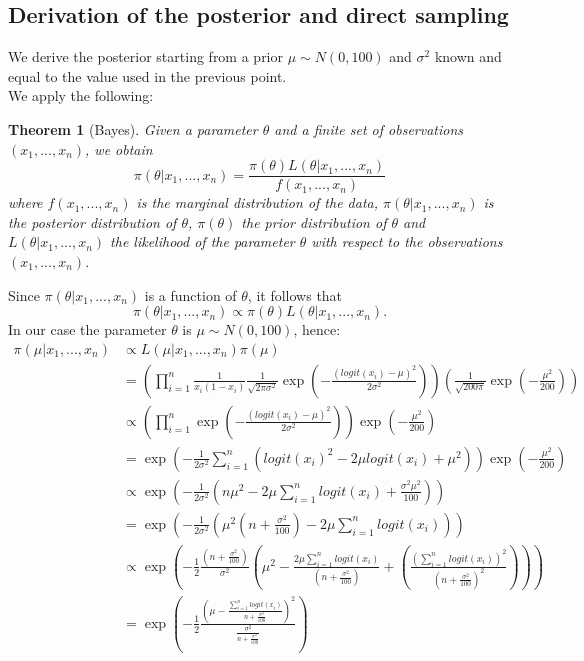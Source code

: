 \documentclass[a4paper,12pt]{article}
\newtheorem{theorem}{Theorem}[section]
\begin{document}
\subsection{Derivation of the posterior and direct sampling}
We derive the posterior starting from a prior \( \mu \sim N(0,100)\) and \(\sigma^2\) known and equal to the value used in the previous point. \\
We apply the following:
\begin{theorem}[Bayes]
    Given a parameter \(\theta\) and a finite set of observations \((x_1,...,x_n)\), we obtain
    \[ \pi(\theta|x_1,...,x_n) = \frac{\pi(\theta)L(\theta|x_1,...,x_n)}{f(x_1,...,x_n)}\]
    where \(f(x_1,...,x_n)\) is the marginal distribution of the data, \(\pi(\theta|x_1,...,x_n)\) is the posterior distribution of \(\theta\), \(\pi(\theta)\) the prior distribution of \(\theta\) and \(L(\theta|x_1,...,x_n)\) the likelihood of the parameter \(\theta\) with respect to the observations \((x_1,...,x_n)\).
\end{theorem}
Since \(\pi(\theta|x_1,...,x_n)\) is a function of \(\theta\), it follows that
\[\pi(\theta|x_1,...,x_n) \propto \pi(\theta)L(\theta|x_1,...,x_n).\]
In our case the parameter \(\theta\) is \(\mu \sim N(0,100)\), hence:
\begin{align*}
    \pi(\mu|x_1,...,x_n) &\propto L(\mu|x_1,...,x_n)\pi(\mu) \\
    &= \left(\prod_{i=1}^{n} \frac{1}{x_i(1-x_i)} \frac{1}{\sqrt{2\pi\sigma^2}} \exp \left(-\frac{(logit(x_i)-\mu)^2}{2\sigma^2} \right) \right) \left( \frac{1}{\sqrt{200 \pi}} \exp\left(-\frac{\mu^2}{200} \right) \right)  \\
    &\propto \left(\prod_{i=1}^{n} \exp \left(-\frac{(logit(x_i)-\mu)^2}{2\sigma^2} \right)  \right) \exp\left(-\frac{\mu^2}{200} \right) \\
    &= \exp \left( -\frac{1}{2\sigma^2}\sum_{i=1}^{n} (logit(x_i)^2 - 2\mu  logit(x_i) + \mu^2) \right) \exp\left(-\frac{\mu^2}{200} \right) \\
    &\propto \exp \left( - \frac{1}{2\sigma^2} \left( n\mu^2 - 2\mu \sum_{i=1}^{n} logit(x_i) + \frac{\sigma^2 \mu^2}{100}\right) \right) \\
    &= \exp \left( - \frac{1}{2\sigma^2} \left( \mu^2\left( n + \frac{\sigma^2}{100} \right)- 2\mu \sum_{i=1}^{n} logit(x_i)\right) \right) \\
    &\propto \exp \left( - \frac{1}{2} \frac{\left(n + \frac{\sigma^2}{100} \right)}{\sigma^2} \left( \mu^2- \frac{2\mu \sum_{i=1}^{n} logit(x_i)}{\left(n + \frac{\sigma^2}{100} \right)} + \left( \frac{(\sum_{i=1}^{n} logit(x_i))^2}{\left(n + \frac{\sigma^2}{100} \right)^2} \right)\right) \right) \\
    &= \exp \left(- \frac{1}{2} \frac{\left( \mu - \frac{\sum_{i=1}^{n} logit(x_i)}{n+\frac{\sigma^2}{100}} \right)^2}{\frac{\sigma^2}{n + \frac{\sigma^2}{100}}} \right)
\end{align*}
\end{document}
